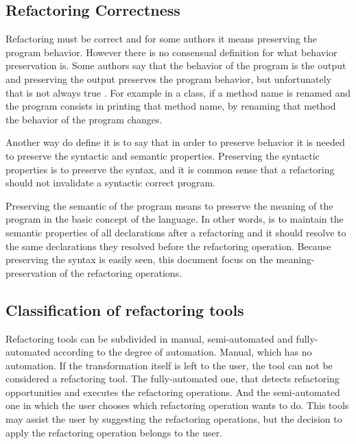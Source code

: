 \subsection{Refactoring Correctness}
Refactoring must be correct and for some authors it means preserving the program behavior.
However there is no consensual definition for what behavior preservation is.
Some authors say that the behavior of the program is the output and preserving the output preserves the program behavior, but unfortunately that is not always true \cite{erb2010survey}.
For example in a class, if a method name is renamed and the program consists in printing that method name, by renaming that method the behavior of the program changes.

Another way do define it is to say that in order to preserve behavior it is needed to preserve the syntactic and semantic properties.
Preserving the syntactic properties is to preserve the syntax, and it is common sense that a refactoring should not invalidate a syntactic correct program.

Preserving the semantic of the program means to preserve the meaning of the program in the basic concept of the language. 
In other words, is to  maintain the semantic properties of all declarations after a refactoring and it should resolve to the same declarations they resolved before the refactoring operation.
Because preserving the syntax is easily seen, this document focus on the meaning-preservation of the refactoring operations. 






\subsection{Classification of refactoring tools} %
Refactoring tools can be subdivided in manual, semi-automated and fully-automated according to the degree of automation.
Manual, which has no automation. If the transformation itself is left to the user, the tool can not be considered a refactoring tool.
The fully-automated one, that detects refactoring opportunities and executes the refactoring operations. 
And the semi-automated one in which the user chooses which refactoring operation wants to do. 
This tools may assist the user by suggesting the refactoring operations, but the decision to apply the refactoring operation belongs to the user. \cite{erb2010survey}



